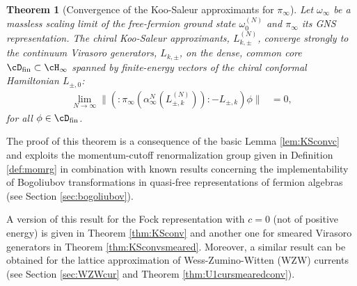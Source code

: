 \documentclass[a4paper, 11pt]{article}
\DeclareMathOperator{\1}{\mathds{1}}
\newtheorem{letterthm}{Theorem}
\begin{document}
\begin{letterthm}[Convergence of the Koo-Saleur approximants for $\pi_{\infty}$]
\label{thm:A}
Let $\omega_{\infty}$ be a massless scaling limit of the free-fermion ground state $\omega^{(N)}_{0}$ and $\pi_{\infty}$ its GNS representation. The chiral Koo-Saleur approximants, $L^{(N)}_{k,\pm}$, converge strongly to the continuum Virasoro generators, $L_{k,\pm}$, on the dense, common core $\cD_{\textup{fin}}\subset\cH_{\infty}$ spanned by finite-energy vectors of the chiral conformal Hamiltonian $L_{\pm,0}$:
\begin{align*}
\lim_{N\rightarrow\infty}\|(:\!\pi_{\infty}(\alpha^{N}_{\infty}(L^{(N)}_{\pm,k})\!)\!: - L_{\pm,k})\phi\| & = 0,
\end{align*}
for all $\phi\in\cD_{\textup{fin}}$.
\end{letterthm}
The proof of this theorem is a consequence of the basic Lemma \ref{lem:KSconvc} and exploits the momentum-cutoff renormalization group given in Definition \ref{def:momrg} in combination with known results concerning the implementability of Bogoliubov transformations in quasi-free representations of fermion algebras (see Section \ref{sec:bogoliubov}).

A version of this result for the Fock representation with $c=0$ (not of positive energy) is given in Theorem \ref{thm:KSconv} and another one for smeared Virasoro generators in Theorem \ref{thm:KSconvsmeared}. Moreover, a similar result can be obtained for the lattice approximation of Wess-Zumino-Witten (WZW) currents (see Section \ref{sec:WZWcur} and Theorem \ref{thm:U1cursmearedconv}).

\bigskip
\end{document}
